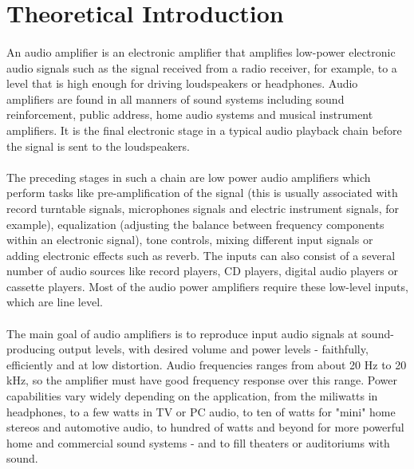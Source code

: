 \section{Theoretical Introduction}
\label{sec:theoretical}

\paragraph{}
An audio amplifier is an electronic amplifier that amplifies low-power electronic audio signals such as the signal received from a radio receiver, for example, to a level that is high enough for driving loudspeakers or headphones. Audio amplifiers are found in all manners of sound systems including sound reinforcement, public address, home audio systems and musical instrument amplifiers. It is the final electronic stage in a typical audio playback chain before the signal is sent to the loudspeakers. 

\paragraph{} 
The preceding stages in such a chain are low power audio amplifiers which perform tasks like pre-amplification of the signal (this is usually associated with record turntable signals, microphones signals and electric instrument signals, for example), equalization (adjusting the balance between frequency components within an electronic signal), tone controls, mixing different input signals or adding electronic effects such as reverb. The inputs can also consist of a several number of audio sources like record players, CD players, digital audio players or cassette players. Most of the audio power amplifiers require these low-level inputs, which are line level.

\paragraph{} 
The main goal of audio amplifiers is to reproduce input audio signals at sound-producing output levels, with desired volume and power levels - faithfully, efficiently and at low distortion. Audio frequencies ranges from about 20 Hz to 20 kHz, so the amplifier must have good frequency response over this range. Power capabilities vary widely depending on the application, from the miliwatts in headphones, to a few watts in TV or PC audio, to ten of watts for "mini" home stereos and automotive audio, to hundred of watts and beyond for more powerful home and commercial sound systems - and to fill theaters or auditoriums with sound.

